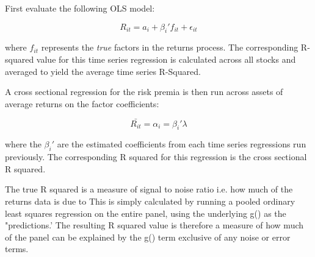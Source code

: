 \documentclass[11pt, a4paper, table]{article}
\begin{document}
First evaluate the following OLS model:

\begin{equation}
	R_{it} = a_i + \beta_i' f_{it} + \epsilon_{it} 
\end{equation}

where $f_{it}$ represents the \textit{true} factors in the returns process. The corresponding R-squared value for this time series regression is calculated across all stocks and averaged to yield the average time series R-Squared. 

A cross sectional regression for the risk premia is then run across assets of average returns on the factor coefficients:

\begin{equation}
	\bar{R_{it}} = \alpha_i = \beta_i' \lambda
\end{equation}

where the $\beta_i'$ are the estimated coefficients from each time series regressions run previously. The corresponding R squared for this regression is the cross sectional R squared.

The true R squared is a measure of signal to noise ratio i.e. how much of the returns data is due to 
This is simply calculated by running a pooled ordinary least squares regression on the entire panel, using the underlying g() as the "predictions.' The resulting R squared value is therefore a measure of how much of the panel can be explained by the g() term exclusive of any noise or error terms.




\end{document}
